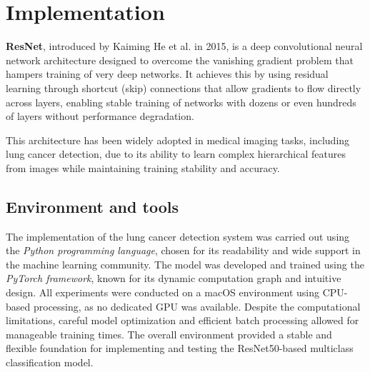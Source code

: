 
\section{Implementation}

\textbf{ResNet}, introduced by Kaiming He et al. in 2015, is a deep convolutional neural network 
architecture designed to overcome the vanishing gradient problem that hampers training of very deep 
networks. It achieves this by using residual learning through shortcut (skip) connections that 
allow gradients to flow directly across layers, enabling stable training of networks with dozens or 
even hundreds of layers without performance degradation. \cite{gb2023}

This architecture has been widely adopted in medical imaging tasks, including lung cancer detection, 
due to its ability to learn complex hierarchical features from images while maintaining training 
stability and accuracy. \cite{jptcp2023}


\subsection{Environment and tools}
The implementation of the lung cancer detection system was carried out using the \textit{Python 
programming language}, chosen for its readability and wide support in the machine learning 
community. The model was developed and trained using the \textit{PyTorch framework}, known for its 
dynamic computation graph and intuitive design. All experiments were conducted on a macOS 
environment using CPU-based processing, as no dedicated GPU was available. Despite the computational 
limitations, careful model optimization and efficient batch processing allowed for manageable 
training times. The overall environment provided a stable and flexible foundation for implementing 
and testing the ResNet50-based multiclass classification model.

